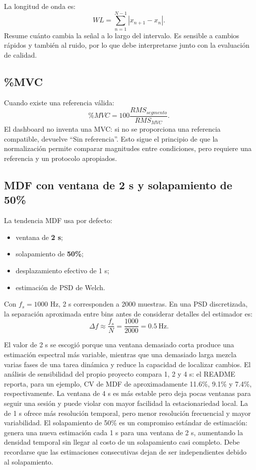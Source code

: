 \documentclass[11pt,spanish]{article}
\begin{document}
La longitud de onda es:
\begin{equation}
WL=\sum_{n=1}^{N-1}|x_{n+1}-x_n|.
\end{equation}
Resume cuánto cambia la señal a lo largo del intervalo. Es sensible a cambios rápidos y también al ruido, por lo que debe interpretarse junto con la evaluación de calidad.

\subsection{\%MVC}

Cuando existe una referencia válida:
\begin{equation}
\%MVC=100\frac{RMS_{segmento}}{RMS_{MVC}}.
\end{equation}
El dashboard no inventa una MVC: si no se proporciona una referencia compatible, devuelve ``Sin referencia''. Esto sigue el principio de que la normalización permite comparar magnitudes entre condiciones, pero requiere una referencia y un protocolo apropiados.

\subsection{MDF con ventana de 2 s y solapamiento de 50\%}

La tendencia MDF usa por defecto:
\begin{itemize}
    \item ventana de \textbf{2 s};
    \item solapamiento de \textbf{50\%};
    \item desplazamiento efectivo de 1 s;
    \item estimación de PSD de Welch.
\end{itemize}

Con $f_s=1000$ Hz, 2 s corresponden a 2000 muestras. En una PSD discretizada, la separación aproximada entre bins antes de considerar detalles del estimador es:
\begin{equation}
\Delta f\approx\frac{f_s}{N}=\frac{1000}{2000}=0.5\ \mathrm{Hz}.
\end{equation}

El valor de 2 s se escogió porque una ventana demasiado corta produce una estimación espectral más variable, mientras que una demasiado larga mezcla varias fases de una tarea dinámica y reduce la capacidad de localizar cambios. El análisis de sensibilidad del propio proyecto compara 1, 2 y 4 s: el README reporta, para un ejemplo, CV de MDF de aproximadamente 11.6\%, 9.1\% y 7.4\%, respectivamente. La ventana de 4 s es más estable pero deja pocas ventanas para seguir una sesión y puede violar con mayor facilidad la estacionariedad local. La de 1 s ofrece más resolución temporal, pero menor resolución frecuencial y mayor variabilidad.
El solapamiento de 50\% es un compromiso estándar de estimación: genera una nueva estimación cada 1 s para una ventana de 2 s, aumentando la densidad temporal sin llegar al costo de un solapamiento casi completo. Debe recordarse que las estimaciones consecutivas dejan de ser independientes debido al solapamiento.
\end{document}
